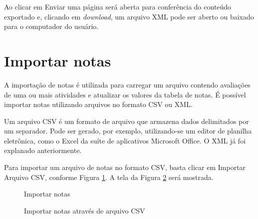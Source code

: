 Ao clicar em Enviar uma página será aberta para conferência do conteúdo exportado e, clicando em \textit{download}, um arquivo XML pode ser aberto ou baixado para o computador do usuário. 

\section{Importar notas}

A importação de notas é utilizada para carregar um arquivo contendo avaliações de uma ou mais atividades e atualizar os valores da tabela de notas. É possível importar notas utilizando arquivos no formato CSV ou XML.

Um arquivo CSV é um formato de arquivo que armazena dados delimitados por um separador. Pode ser gerado, por exemplo, utilizando-se um editor de planilha eletrônica, como o Excel da suíte de aplicativos Microsoft Office. O XML já foi explanado anteriormente.

Para importar um arquivo de notas no formato CSV, basta clicar em Importar Arquivo CSV, conforme Figura \ref{fig:cap6_38}. A tela da Figura \ref{fig:cap6_39} será mostrada.

\begin{figure}[!htbp]
 \begin{center}
  \caption{Importar notas}
  \label{fig:cap6_38}
 \end{center}
\end{figure}

\begin{figure}[!htbp]
 \begin{center}
  \caption{Importar notas através de arquivo CSV}
  \label{fig:cap6_39}
 \end{center}
\end{figure}

